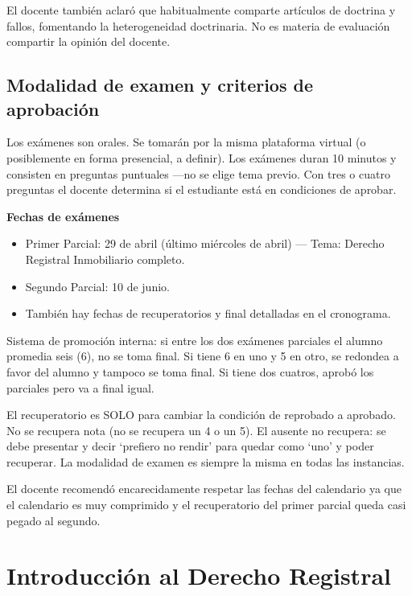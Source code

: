 \documentclass[12pt,oneside]{book}
\begin{document}
El docente también aclaró que habitualmente comparte artículos de doctrina y fallos, fomentando la heterogeneidad doctrinaria. No es materia de evaluación compartir la opinión del docente.

\section{Modalidad de examen y criterios de aprobación}
\label{sec:examenes}

Los exámenes son orales. Se tomarán por la misma plataforma virtual (o posiblemente en forma presencial, a definir). Los exámenes duran 10 minutos y consisten en preguntas puntuales ---no se elige tema previo. Con tres o cuatro preguntas el docente determina si el estudiante está en condiciones de aprobar.

\begin{important}
\textbf{Fechas de exámenes}
\begin{itemize}
    \item Primer Parcial: 29 de abril (último miércoles de abril) --- Tema: Derecho Registral Inmobiliario completo.
    \item Segundo Parcial: 10 de junio.
    \item También hay fechas de recuperatorios y final detalladas en el cronograma.
\end{itemize}
\end{important}

Sistema de promoción interna: si entre los dos exámenes parciales el alumno promedia seis (6), no se toma final. Si tiene 6 en uno y 5 en otro, se redondea a favor del alumno y tampoco se toma final. Si tiene dos cuatros, aprobó los parciales pero va a final igual.

El recuperatorio es SOLO para cambiar la condición de reprobado a aprobado. No se recupera nota (no se recupera un 4 o un 5). El ausente no recupera: se debe presentar y decir `prefiero no rendir' para quedar como `uno' y poder recuperar. La modalidad de examen es siempre la misma en todas las instancias.

El docente recomendó encarecidamente respetar las fechas del calendario ya que el calendario es muy comprimido y el recuperatorio del primer parcial queda casi pegado al segundo.


\chapter{Introducción al Derecho Registral}
\label{chap:introduccion}
\end{document}
